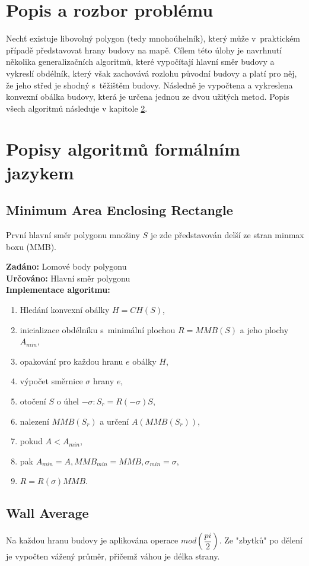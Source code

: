 \documentclass[a4paper, 12pt, oneside, titlepage]{article} %
\begin{document}
\section{Popis a rozbor problému}
Nechť existuje libovolný polygon (tedy mnohoúhelník), který může v~praktickém případě představovat hrany budovy na mapě. Cílem této úlohy je navrhnutí několika generalizačních algoritmů, které vypočítají hlavní směr budovy a vykreslí obdélník, který však zachovává rozlohu původní budovy a platí pro něj, že jeho střed je shodný s~těžištěm budovy. Následně je vypočtena a vykreslena konvexní obálka budovy, která je určena jednou ze dvou užitých metod. Popis všech algoritmů následuje v kapitole \ref{popisalg}.

\section{Popisy algoritmů formálním jazykem} \label{popisalg}
\subsection{Minimum Area Enclosing Rectangle} \label{maer}
První hlavní směr polygonu množiny $S$ je zde představován delší ze stran minmax boxu (MMB).

\noindent\textbf{Zadáno:} Lomové body polygonu\\
\noindent\textbf{Určováno:} Hlavní směr polygonu\\
\noindent\textbf{Implementace algoritmu:}\\
\begin{enumerate}
\item Hledání konvexní obálky $H=CH(S)$,
\item inicializace obdélníku s~minimální plochou $R=MMB(S)$ a jeho plochy $A_{min}$,
\item opakování pro každou hranu $e$ obálky $H$,
\item \quad výpočet směrnice $\sigma$ hrany $e$,
\item \quad otočení $S$ o úhel $-\sigma : S_r=R(-\sigma)S$,
\item \quad nalezení $MMB(S_r)$ a určení $A(MMB(S_r))$,
\item \quad pokud $A<A_{min}$,
\item \quad \quad pak $A_{min}=A, MMB_{min}=MMB, \sigma_{min}=\sigma$,
\item $R=R(\sigma)MMB$.
\end{enumerate}

\subsection{Wall Average} \label{wa}
Na každou hranu budovy je aplikována operace $mod(\dfrac{pi}{2})$. Ze "zbytků" po dělení je vypočten vážený průměr, přičemž váhou je délka strany.
\end{document}
